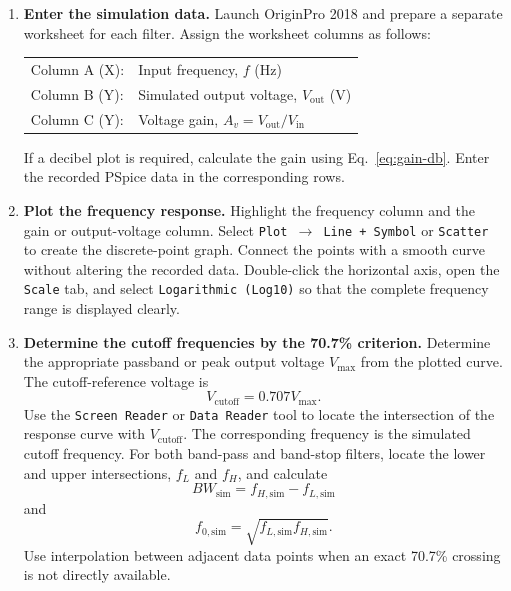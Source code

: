 \documentclass[12pt,a4paper]{article}
\begin{document}
	\begin{enumerate}[leftmargin=0.8cm,label=\textbf{Step \arabic*:},itemsep=0.55em]
		\item \textbf{Enter the simulation data.}
		Launch OriginPro 2018 and prepare a separate worksheet for each filter. Assign the worksheet columns as follows:
		\begin{center}
			\begin{tabular}{@{}ll@{}}
				Column A (X): & Input frequency, $f$ ($\mathrm{Hz}$) \\
				Column B (Y): & Simulated output voltage, $V_{\mathrm{out}}$ ($\mathrm{V}$) \\
				Column C (Y): & Voltage gain, $A_v=V_{\mathrm{out}}/V_{\mathrm{in}}$
			\end{tabular}
		\end{center}
		If a decibel plot is required, calculate the gain using Eq.~\eqref{eq:gain-db}. Enter the recorded PSpice data in the corresponding rows.
		
		\item \textbf{Plot the frequency response.}
		Highlight the frequency column and the gain or output-voltage column. Select \texttt{Plot $\rightarrow$ Line + Symbol} or \texttt{Scatter} to create the discrete-point graph. Connect the points with a smooth curve without altering the recorded data. Double-click the horizontal axis, open the \texttt{Scale} tab, and select \texttt{Logarithmic (Log10)} so that the complete frequency range is displayed clearly.
		
		\item \textbf{Determine the cutoff frequencies by the 70.7\% criterion.}
		Determine the appropriate passband or peak output voltage $V_{\max}$ from the plotted curve. The cutoff-reference voltage is
		\begin{equation}
			V_{\mathrm{cutoff}}=0.707V_{\max}.
			\label{eq:cutoff-reference-voltage}
		\end{equation}
		Use the \texttt{Screen Reader} or \texttt{Data Reader} tool to locate the intersection of the response curve with $V_{\mathrm{cutoff}}$. The corresponding frequency is the simulated cutoff frequency. For both band-pass and band-stop filters, locate the lower and upper intersections, $f_L$ and $f_H$, and calculate
		\begin{equation}
			BW_{\mathrm{sim}}=f_{H,\mathrm{sim}}-f_{L,\mathrm{sim}}
			\label{eq:simulated-bandwidth}
		\end{equation}
		and
		\begin{equation}
			f_{0,\mathrm{sim}}=\sqrt{f_{L,\mathrm{sim}}f_{H,\mathrm{sim}}}.
			\label{eq:simulated-center-frequency}
		\end{equation}
		Use interpolation between adjacent data points when an exact 70.7\% crossing is not directly available.
		

\end{enumerate}
\end{document}
